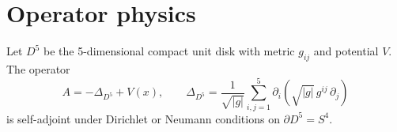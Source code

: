 \section{Operator physics}
Let $D^5$ be the 5-dimensional compact unit disk with metric $g_{ij}$ and potential $V$. The operator
\[
A = -\Delta_{D^5} + V(x), \qquad
\Delta_{D^5} = \frac{1}{\sqrt{|g|}} \sum_{i,j=1}^{5} \partial_i\!\left(\sqrt{|g|}\, g^{ij}\, \partial_j\right)
\]
is self-adjoint under Dirichlet or Neumann conditions on $\partial D^5 = S^4$.
